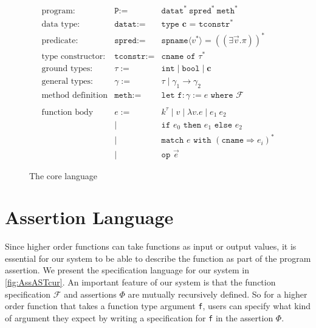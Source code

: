 \begin{figure}[htp]
$$\begin{array}{rrl}
    \text{program}: & \texttt{P} := &\texttt{datat}^* \ \texttt{spred}^* \ \texttt{meth}^* \\
    \text{data type}: & \texttt{datat} := & \texttt{type } \mathbf{c} \texttt{ = } \texttt{tconstr}^* \\
    \text{predicate}: & \texttt{spred} := & \texttt{spname}\langle v^* \rangle = \left((\exists \vec{v}. \pi)\right)^{*} %
    \\
    \text{type constructor}: & \texttt{tconstr} := & \texttt{cname of } \tau^* \\
    \text{ground types}: &\tau := & \texttt{int} \mid \texttt{bool} \mid %
    \mathbf{c} \\  
    \text{general types}: &\gamma := & \tau \mid \gamma_1 \rightarrow \gamma_2 %
    \\  
    \text{method definition} & \texttt{meth} := 
       & \texttt{let f}: \gamma := e  \texttt{ where } \mathcal{F}  \\
    \\
    \text{function body} & e := & k^{\tau} \mid v \mid \lambda v.e \mid e_1 \ e_2 \\
    & \mid & \texttt{if } e_0 \texttt{ then } e_1 \texttt{ else } e_2 \\
    & \mid & \texttt{match } e \texttt{ with } (\texttt{cname} \Rightarrow e_i)^* \\
    & \mid & \texttt{op } \vec{e}
\end{array}$$
    \caption{The core language}
    \label{fig:LanAST}
\end{figure}


\section{Assertion Language}

Since higher order functions can take functions as input or output values,
it is essential for our system to be able to describe the function as part
of the program assertion. We present the specification language for our
system in \autoref{fig:AssASTcur}. An important feature of our system is that
the function specification $\mathcal{F}$ and assertions $\Phi$ are 
mutually recursively defined. So for a higher order function that takes a 
function type argument \texttt{f},  users can specify what kind of argument 
they expect by writing a specification for \texttt{f} in the 
assertion $\Phi$.

